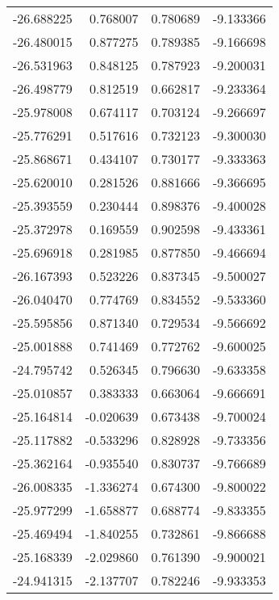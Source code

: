 \begin{tabular}{rrrr}
      -26.688225 &         0.768007 &    0.780689 &  -9.133366 \\
      -26.480015 &         0.877275 &    0.789385 &  -9.166698 \\
      -26.531963 &         0.848125 &    0.787923 &  -9.200031 \\
      -26.498779 &         0.812519 &    0.662817 &  -9.233364 \\
      -25.978008 &         0.674117 &    0.703124 &  -9.266697 \\
      -25.776291 &         0.517616 &    0.732123 &  -9.300030 \\
      -25.868671 &         0.434107 &    0.730177 &  -9.333363 \\
      -25.620010 &         0.281526 &    0.881666 &  -9.366695 \\
      -25.393559 &         0.230444 &    0.898376 &  -9.400028 \\
      -25.372978 &         0.169559 &    0.902598 &  -9.433361 \\
      -25.696918 &         0.281985 &    0.877850 &  -9.466694 \\
      -26.167393 &         0.523226 &    0.837345 &  -9.500027 \\
      -26.040470 &         0.774769 &    0.834552 &  -9.533360 \\
      -25.595856 &         0.871340 &    0.729534 &  -9.566692 \\
      -25.001888 &         0.741469 &    0.772762 &  -9.600025 \\
      -24.795742 &         0.526345 &    0.796630 &  -9.633358 \\
      -25.010857 &         0.383333 &    0.663064 &  -9.666691 \\
      -25.164814 &        -0.020639 &    0.673438 &  -9.700024 \\
      -25.117882 &        -0.533296 &    0.828928 &  -9.733356 \\
      -25.362164 &        -0.935540 &    0.830737 &  -9.766689 \\
      -26.008335 &        -1.336274 &    0.674300 &  -9.800022 \\
      -25.977299 &        -1.658877 &    0.688774 &  -9.833355 \\
      -25.469494 &        -1.840255 &    0.732861 &  -9.866688 \\
      -25.168339 &        -2.029860 &    0.761390 &  -9.900021 \\
      -24.941315 &        -2.137707 &    0.782246 &  -9.933353 \\

\end{tabular}
